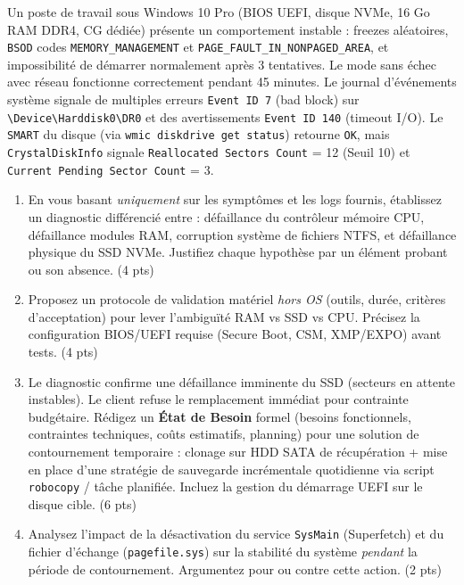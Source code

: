\documentclass[11pt]{article}
\begin{document}
\begin{exercice}
Un poste de travail sous Windows 10 Pro (BIOS UEFI, disque NVMe, 16 Go RAM DDR4, CG dédiée) présente un comportement instable : freezes aléatoires, \texttt{BSOD} codes \texttt{MEMORY\_MANAGEMENT} et \texttt{PAGE\_FAULT\_IN\_NONPAGED\_AREA}, et impossibilité de démarrer normalement après 3 tentatives. Le mode sans échec avec réseau fonctionne correctement pendant 45 minutes. Le journal d'événements système signale de multiples erreurs \texttt{Event ID 7} (bad block) sur \texttt{\textbackslash Device\textbackslash Harddisk0\textbackslash DR0} et des avertissements \texttt{Event ID 140} (timeout I/O). Le \texttt{SMART} du disque (via \texttt{wmic diskdrive get status}) retourne \texttt{OK}, mais \texttt{CrystalDiskInfo} signale \texttt{Reallocated Sectors Count} = 12 (Seuil 10) et \texttt{Current Pending Sector Count} = 3.

\begin{enumerate}
    \item En vous basant \textit{uniquement} sur les symptômes et les logs fournis, établissez un diagnostic différencié entre : défaillance du contrôleur mémoire CPU, défaillance modules RAM, corruption système de fichiers NTFS, et défaillance physique du SSD NVMe. Justifiez chaque hypothèse par un élément probant ou son absence. (4 pts)
    \item Proposez un protocole de validation matériel \textit{hors OS} (outils, durée, critères d'acceptation) pour lever l'ambiguïté RAM vs SSD vs CPU. Précisez la configuration BIOS/UEFI requise (Secure Boot, CSM, XMP/EXPO) avant tests. (4 pts)
    \item Le diagnostic confirme une défaillance imminente du SSD (secteurs en attente instables). Le client refuse le remplacement immédiat pour contrainte budgétaire. Rédigez un \textbf{État de Besoin} formel (besoins fonctionnels, contraintes techniques, coûts estimatifs, planning) pour une solution de contournement temporaire : clonage sur HDD SATA de récupération + mise en place d'une stratégie de sauvegarde incrémentale quotidienne via script \texttt{robocopy} / tâche planifiée. Incluez la gestion du démarrage UEFI sur le disque cible. (6 pts)
    \item Analysez l'impact de la désactivation du service \texttt{SysMain} (Superfetch) et du fichier d'échange (\texttt{pagefile.sys}) sur la stabilité du système \textit{pendant} la période de contournement. Argumentez pour ou contre cette action. (2 pts)
\end{enumerate}
\end{exercice}
\end{document}
